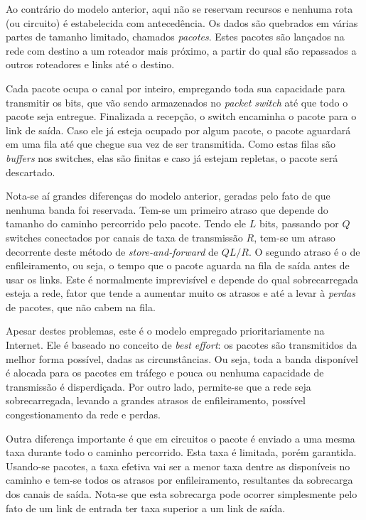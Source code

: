 Ao contrário do modelo anterior, aqui não se reservam recursos e nenhuma rota (ou circuito) é estabelecida com antecedência.
Os dados são quebrados em várias partes de tamanho limitado, chamados \emph{pacotes}. 
Estes pacotes são lançados na rede com destino a um roteador mais próximo, a partir do qual são repassados a outros roteadores e links até o destino.

Cada pacote ocupa o canal por inteiro, empregando toda sua capacidade para transmitir os bits, que vão sendo armazenados no \emph{packet switch} até que todo o pacote seja entregue.
Finalizada a recepção, o switch encaminha o pacote para o link de saída. 
Caso ele já esteja ocupado por algum pacote, o pacote aguardará em uma fila até que chegue sua vez de ser transmitida.
Como estas filas são \emph{buffers} nos switches, elas são finitas e caso já estejam repletas, o pacote será descartado.

Nota-se aí grandes diferenças do modelo anterior, geradas pelo fato de que nenhuma banda foi reservada.
Tem-se um primeiro atraso que depende do tamanho do caminho percorrido pelo pacote. Tendo ele $L$ bits, passando por $Q$ switches conectados por canais de taxa de transmissão $R$, tem-se um atraso decorrente deste método de \emph{store-and-forward} de $QL/R$.
O segundo atraso é o de enfileiramento, ou seja, o tempo que o pacote aguarda na fila de saída antes de usar os links.
Este é normalmente imprevisível e depende do qual sobrecarregada esteja a rede, fator que tende a aumentar muito os atrasos e até a levar à \emph{perdas} de pacotes, que não cabem na fila.

Apesar destes problemas, este é o modelo empregado prioritariamente na Internet.
Ele é baseado no conceito de \emph{best effort}: os pacotes são transmitidos da melhor forma possível, dadas as circunstâncias.
Ou seja, toda a banda disponível é alocada para os pacotes em tráfego e pouca ou nenhuma capacidade de transmissão é disperdiçada.
Por outro lado, permite-se que a rede seja sobrecarregada, levando a grandes atrasos de enfileiramento, possível congestionamento da rede e perdas.

Outra diferença importante é que em circuitos o pacote é enviado a uma mesma taxa durante todo o caminho percorrido.
Esta taxa é limitada, porém garantida.
Usando-se pacotes, a taxa efetiva vai ser a menor taxa dentre as disponíveis no caminho e tem-se todos os atrasos por enfileiramento, resultantes da sobrecarga dos canais de saída.
Nota-se que esta sobrecarga pode ocorrer simplesmente pelo fato de um link de entrada ter taxa superior a um link de saída.

